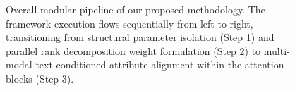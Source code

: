 \begin{figure}[h]
\caption{Overall modular pipeline of our proposed methodology. The framework execution flows sequentially from left to right, transitioning from structural parameter isolation (Step 1) and parallel rank decomposition weight formulation (Step 2) to multi-modal text-conditioned attribute alignment within the attention blocks (Step 3).}
\label{fig:proposed_step_pipeline}
\end{figure}